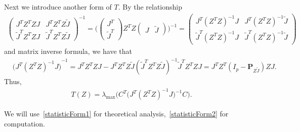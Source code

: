 \documentclass[12pt]{article} %
\newcommand{\bP}{\mathbf{P}}
\theoremstyle{definition}
\begin{document}
Next we introduce another form of $T$.
By the relationship
\begin{equation*}
    \begin{aligned}
        \begin{pmatrix}
            J^T Z^T ZJ & J^T Z^T Z\tilde{J}\\
            \tilde{J}^T Z^T ZJ & \tilde{J}^T Z^T Z \tilde{J}
        \end{pmatrix}^{-1}
        =
        \Big(
        \begin{pmatrix}
            J^T\\
            \tilde{J}^T
        \end{pmatrix}
        Z^T Z
        \begin{pmatrix}
            J&\tilde{J}
        \end{pmatrix}
        \Big)^{-1}
        =
        \begin{pmatrix}
            J^T {(Z^T Z)}^{-1}J & J^T {(Z^T Z)}^{-1}\tilde{J}\\
            \tilde{J}^T {(Z^T Z)}^{-1}J & \tilde{J}^T {(Z^T Z)}^{-1} \tilde{J}
        \end{pmatrix}
    \end{aligned}
\end{equation*}
and matrix inverse formula, we have that
\begin{equation*}
    \begin{aligned}
        &{\big( J^T {(Z^T Z)}^{-1}J \big)}^{-1}
        =J^T Z^T ZJ - J^T Z^T Z\tilde{J}{(\tilde{J}^T Z^T Z \tilde{J})}^{-1}
            \tilde{J}^T Z^T ZJ 
        = J^T Z^T( I_p- \bP_{Z\tilde{J}}) ZJ.
    \end{aligned}
\end{equation*}
Thus, 
\begin{equation}\label{statisticForm2}
    \begin{aligned}
        T(Z)=
        \lambda_{\max}\Big(C^T\big( J^T (Z^T Z)^{-1}J \big)^{-1}C\Big).
    \end{aligned}
\end{equation}

We will use~\eqref{statisticForm1} for theoretical analysis,~\eqref{statisticForm2} for computation.
\end{document}
